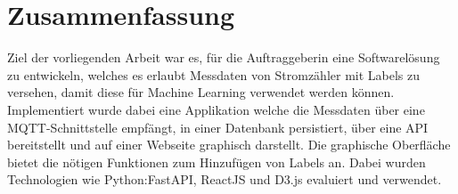 \begingroup
\let\clearpage\relax
\let\cleardoublepage\relax
\let\cleardoublepage\relax

\cleardoublepage


\chapter*{Zusammenfassung}
Ziel der vorliegenden Arbeit war es, für die Auftraggeberin eine Softwarelösung zu entwickeln, welches es erlaubt
Messdaten von Stromzähler mit Labels zu versehen, damit diese für Machine Learning verwendet werden können.
Implementiert wurde dabei eine Applikation welche die Messdaten über eine MQTT-Schnittstelle empfängt,
in einer Datenbank persistiert,
über eine API bereitstellt und
auf einer Webseite graphisch darstellt.
Die graphische Oberfläche bietet die nötigen Funktionen zum Hinzufügen von Labels an.
Dabei wurden Technologien wie Python:FastAPI, ReactJS und D3.js evaluiert und verwendet.


\endgroup

\vfill
